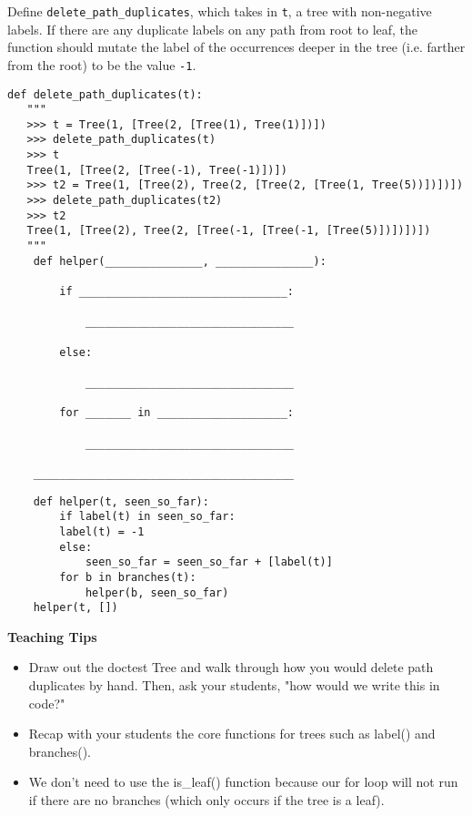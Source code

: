 
\question
Define \texttt{delete\_path\_duplicates}, which takes in \texttt{t}, a tree
with non-negative labels. If there are any duplicate labels on any path
from root to leaf, the function should mutate the label of the occurrences
deeper in the tree (i.e. farther from the root) to be the value \texttt{-1}.

\begin{lstlisting}
def delete_path_duplicates(t):
   """
   >>> t = Tree(1, [Tree(2, [Tree(1), Tree(1)])])
   >>> delete_path_duplicates(t)
   >>> t
   Tree(1, [Tree(2, [Tree(-1), Tree(-1)])])
   >>> t2 = Tree(1, [Tree(2), Tree(2, [Tree(2, [Tree(1, Tree(5))])])])
   >>> delete_path_duplicates(t2)
   >>> t2
   Tree(1, [Tree(2), Tree(2, [Tree(-1, [Tree(-1, [Tree(5)])])])])
   """
    def helper(_______________, _______________):

        if ________________________________:

            ________________________________

        else:

            ________________________________

        for _______ in ____________________:

            ________________________________

    ________________________________________

\end{lstlisting}

\begin{blocksection}
\begin{solution}
\begin{lstlisting}
    def helper(t, seen_so_far):
        if label(t) in seen_so_far:
        label(t) = -1
        else:
            seen_so_far = seen_so_far + [label(t)]
        for b in branches(t):
            helper(b, seen_so_far)
    helper(t, [])
\end{lstlisting}
\end{solution}
\end{blocksection}

\begin{guide}
    \textbf{Teaching Tips}
    \begin{itemize}
       \item Draw out the doctest Tree and walk through how you would delete path duplicates by hand. Then, ask your students, "how would we write this in code?"
       \item Recap with your students the core functions for trees such as label() and branches().
       \item We don't need to use the is\_leaf() function because our for loop will not run if there are no branches (which only occurs if the tree is a leaf).
    \end{itemize}
 \end{guide}

